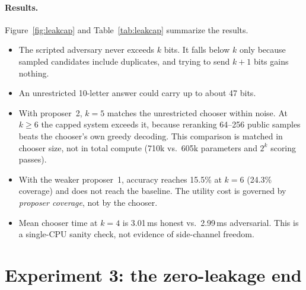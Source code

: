 \documentclass[11pt]{article}
\begin{document}
\paragraph{Results.} Figure~\ref{fig:leakcap} and Table~\ref{tab:leakcap}
summarize the results.
\begin{itemize}
\item The scripted adversary never exceeds $k$ bits. It falls below $k$ only
  because sampled candidates include duplicates, and trying to send $k+1$ bits
  gains nothing.
\item An unrestricted 10-letter answer could carry up to about 47 bits.
\item With proposer~2, $k=5$ matches the unrestricted chooser within noise.
  At $k\ge 6$ the capped system exceeds it, because reranking 64--256 public
  samples beats the chooser's own greedy decoding. This comparison is matched
  in chooser size, not in total compute (710k vs.\ 605k parameters and $2^k$
  scoring passes).
\item With the weaker proposer~1, accuracy reaches 15.5\% at $k=6$ (24.3\%
  coverage) and does not reach the baseline. The utility cost is governed by
  \emph{proposer coverage}, not by the chooser.
\item Mean chooser time at $k=4$ is 3.01\,ms honest vs.\ 2.99\,ms adversarial.
  This is a single-CPU sanity check, not evidence of side-channel freedom.
\end{itemize}

\section{Experiment 3: the zero-leakage end}
\label{sec:residue}
\end{document}
